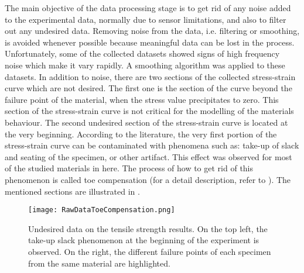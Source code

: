 The main objective of the data processing stage is to get rid of any noise added to the experimental data, normally due to sensor limitations, and also to filter out any undesired data. Removing noise from the data, i.e. filtering or smoothing, is avoided whenever possible because meaningful data can be lost in the process. Unfortunately, some of the collected datasets showed signs of high frequency noise which make it vary rapidly. A smoothing algorithm was applied to these datasets. In addition to noise, there are two sections of the collected stress-strain curve which are not desired. The first one is the section of the curve beyond the failure point of the material, when the stress value precipitates to zero. This section of the stress-strain curve is not critical for the modelling of the materials behaviour. The second undesired section of the stress-strain curve is located at the very beginning. According to the literature, the very first portion of the stress-strain curve can be contaminated with phenomena such as: take-up of slack and seating of the specimen, or other artifact. This effect was observed for most of the studied materials in here. The process of how to get rid of this phenomenon is called toe compensation (for a detail description, refer to \cite{astmd638}). The mentioned sections are illustrated in .

\begin{figure}[htb!]
    \centering
    \texttt{[image: RawDataToeCompensation.png]}
    \caption{Undesired data on the tensile strength results. On the top left, the take-up slack phenomenon at the beginning of the experiment is observed. On the right, the different failure points of each specimen from the same material are highlighted.}
    \label{fig:rawData}
\end{figure}

